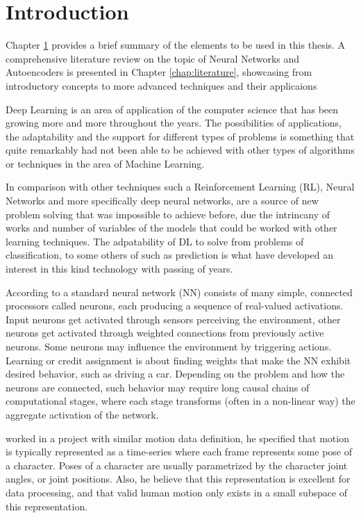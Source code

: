 \chapter{Introduction} \label{chap:introduction}
 Chapter \ref{chap:introduction} provides a brief summary of the elements to be used in this thesis. A comprehensive literature review on the topic of Neural Networks and Autoencoders is presented in Chapter \ref{chap:literature},
 showcasing from introductory concepts to more advanced techniques and their applicaions  

 Deep Learning is an area of application of the computer science that has been growing more and more throughout the years.
 The possibilities of applications, the adaptability and the support for different types of problems is something that quite remarkably 
 had not been able to be achieved with other types of algorithms or techniques in the area of Machine Learning.
 
 In comparison with other techniques such a Reinforcement Learning (RL), Neural Networks and more specifically deep neural networks,
 are a source of new problem solving that was impossible to achieve before, due the intrincany of works and number of variables 
 of the models that could be worked with other learning techniques. The adpatability of DL to solve from problems of classification, to some others of such as prediction is what 
 have developed an interest in this kind technology with passing of years. 
 
 According to \citet{Schmidhuber:2014} a standard neural network (NN) consists of many simple, connected processors called neurons, each producing a sequence of real-valued activations. 
 Input neurons get activated through sensors perceiving the environment, other neurons get activated through weighted connections from previously active neurons. 
 Some neurons may influence the environment by triggering actions. Learning or credit assignment is about finding weights that make the NN exhibit desired behavior, 
 such as driving a car. Depending on the problem and how the neurons are connected, such behavior may require long causal chains of computational stages, 
 where each stage transforms (often in a non-linear way) the aggregate activation of the network.
  
 \citet{Holden:2014} worked in a project with similar motion data definition, he specified that motion is typically represented as a time-series where each frame 
 represents some pose of a character. Poses of a character are usually parametrized by the character joint angles, or joint positions. 
 Also, he believe that this representation is excellent for data processing, and that valid human motion only exists in a small subspace of this representation. 
 
